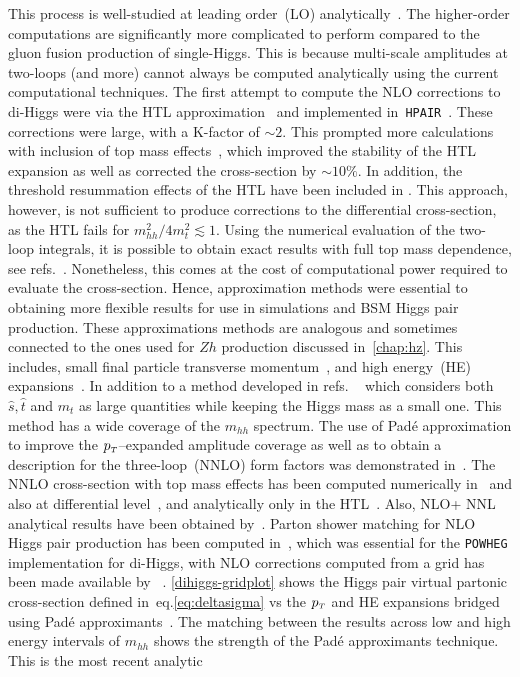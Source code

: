 This process is well-studied at leading order~(LO) analytically~\cite{EBOLI1987269, GLOVER1988282, DICUS1988457, Plehn:1996wb}.  The higher-order computations are significantly more complicated to perform compared to the gluon fusion production of single-Higgs. This is because multi-scale amplitudes at two-loops (and more) cannot always be computed analytically using the current computational techniques.  The first attempt to compute the NLO corrections to di-Higgs were via the HTL approximation~\cite{Dawson:1998py, Altenkamp:2012sx,Grigo:2014jma} and implemented in~\texttt{HPAIR}~\cite{Plehn:1996wb}. These corrections were large, with a K-factor of $ \sim 2$.  This prompted more calculations with inclusion of top mass effects~\cite{deFlorian:2013uza,Grigo:2013rya,Maltoni:2014eza,Grigo:2015dia,Degrassi:2016vss}, which improved the stability of the HTL expansion as well as corrected the cross-section by $\sim 10\%$. In addition, the threshold resummation effects of the HTL have been included in \cite{Shao:2013bz}. This approach, however, is not sufficient to produce corrections to the differential cross-section, as the HTL fails for $m_{hh}^2/4m_t^2 \lesssim 1$. Using the numerical evaluation of the two-loop integrals, it is possible to obtain exact results with full top mass dependence, see refs.~\cite{Borowka:2016ypz,Borowka:2016ehy,Baglio:2018lrj}. Nonetheless, this comes at the cost of computational power required to evaluate the cross-section.  Hence, approximation methods were essential to obtaining more flexible results for use in simulations and BSM Higgs pair production.  These approximations methods are analogous and sometimes connected to the ones used for $Zh$ production discussed in~\autoref{chap:hz}. This includes, small final particle transverse momentum~\cite{Bonciani:2018omm}, and high energy~(HE) expansions~\cite{Davies:2018ood}. In addition to a method developed in refs. ~\cite{Xu:2018eos,Wang:2020nnr} which considers both $\hat s, \hat t$ and $m_t$ as large quantities while keeping the Higgs mass as a small one. This method has a wide coverage of the $m_{hh}$ spectrum.  The use of Pad\'e approximation to improve the $p_{\scriptscriptstyle T}$--expanded amplitude coverage as well as to obtain a description for the three-loop~(NNLO) form factors was demonstrated in~\cite{Davies:2019nhm}. The NNLO cross-section with top mass effects has been computed numerically in~\cite{Grazzini:2018bsd} and also at differential level~\cite{deFlorian:2016uhr}, and analytically only in the HTL~\cite{deFlorian:2013jea}. Also, NLO+ NNL analytical results have been obtained by~\cite{deFlorian:2015moa}. Parton shower matching for NLO Higgs pair production has been computed  in~\cite{Jones:2017giv,Heinrich:2019bkc}, which was essential for the \texttt{POWHEG} implementation for di-Higgs, with NLO corrections computed from a grid has been made available by ~\cite{Heinrich:2017kxx,Heinrich:2019bkc,Heinrich:2020ckp}. \autoref{dihiggs-gridplot} shows the Higgs pair virtual partonic cross-section defined in~eq.\eqref{eq:deltasigma} vs the  $p_{\scriptscriptstyle T}$ and HE expansions bridged using Pad\'e  approximants~\cite{Bellafronte:2022jmo}.  The matching between the results across low and high energy intervals of $m_{hh}$ shows the strength of the Pad\'e  approximants technique.  This is the most recent analytic 